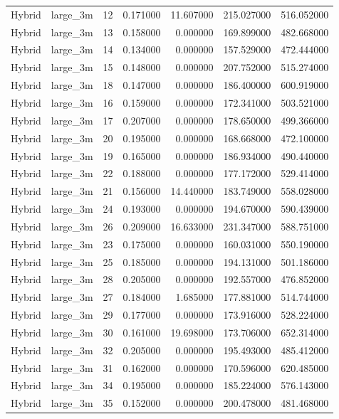 \begin{tabular}{llrrrrr}
Hybrid & large_3m & 12 & 0.171000 & 11.607000 & 215.027000 & 516.052000 \\
Hybrid & large_3m & 13 & 0.158000 & 0.000000 & 169.899000 & 482.668000 \\
Hybrid & large_3m & 14 & 0.134000 & 0.000000 & 157.529000 & 472.444000 \\
Hybrid & large_3m & 15 & 0.148000 & 0.000000 & 207.752000 & 515.274000 \\
Hybrid & large_3m & 18 & 0.147000 & 0.000000 & 186.400000 & 600.919000 \\
Hybrid & large_3m & 16 & 0.159000 & 0.000000 & 172.341000 & 503.521000 \\
Hybrid & large_3m & 17 & 0.207000 & 0.000000 & 178.650000 & 499.366000 \\
Hybrid & large_3m & 20 & 0.195000 & 0.000000 & 168.668000 & 472.100000 \\
Hybrid & large_3m & 19 & 0.165000 & 0.000000 & 186.934000 & 490.440000 \\
Hybrid & large_3m & 22 & 0.188000 & 0.000000 & 177.172000 & 529.414000 \\
Hybrid & large_3m & 21 & 0.156000 & 14.440000 & 183.749000 & 558.028000 \\
Hybrid & large_3m & 24 & 0.193000 & 0.000000 & 194.670000 & 590.439000 \\
Hybrid & large_3m & 26 & 0.209000 & 16.633000 & 231.347000 & 588.751000 \\
Hybrid & large_3m & 23 & 0.175000 & 0.000000 & 160.031000 & 550.190000 \\
Hybrid & large_3m & 25 & 0.185000 & 0.000000 & 194.131000 & 501.186000 \\
Hybrid & large_3m & 28 & 0.205000 & 0.000000 & 192.557000 & 476.852000 \\
Hybrid & large_3m & 27 & 0.184000 & 1.685000 & 177.881000 & 514.744000 \\
Hybrid & large_3m & 29 & 0.177000 & 0.000000 & 173.916000 & 528.224000 \\
Hybrid & large_3m & 30 & 0.161000 & 19.698000 & 173.706000 & 652.314000 \\
Hybrid & large_3m & 32 & 0.205000 & 0.000000 & 195.493000 & 485.412000 \\
Hybrid & large_3m & 31 & 0.162000 & 0.000000 & 170.596000 & 620.485000 \\
Hybrid & large_3m & 34 & 0.195000 & 0.000000 & 185.224000 & 576.143000 \\
Hybrid & large_3m & 35 & 0.152000 & 0.000000 & 200.478000 & 481.468000 \\

\end{tabular}
